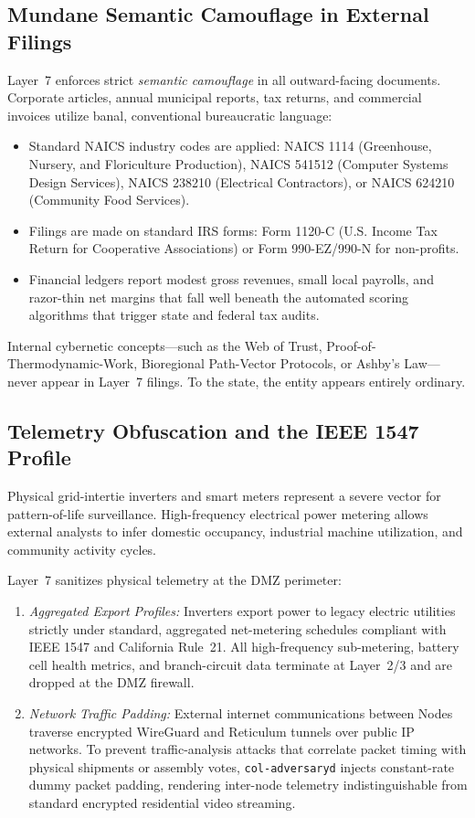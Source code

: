 \subsection{Mundane Semantic Camouflage in External Filings}

Layer~7 enforces strict \textit{semantic camouflage} in all outward-facing documents. Corporate articles, annual municipal reports, tax returns, and commercial invoices utilize banal, conventional bureaucratic language:
\begin{itemize}
  \item Standard NAICS industry codes are applied: NAICS 1114 (Greenhouse, Nursery, and Floriculture Production), NAICS 541512 (Computer Systems Design Services), NAICS 238210 (Electrical Contractors), or NAICS 624210 (Community Food Services).
  \item Filings are made on standard IRS forms: Form 1120-C (U.S. Income Tax Return for Cooperative Associations) or Form 990-EZ/990-N for non-profits.
  \item Financial ledgers report modest gross revenues, small local payrolls, and razor-thin net margins that fall well beneath the automated scoring algorithms that trigger state and federal tax audits.
\end{itemize}
Internal cybernetic concepts—such as the Web of Trust, Proof-of-Thermodynamic-Work, Bioregional Path-Vector Protocols, or Ashby's Law—never appear in Layer~7 filings. To the state, the entity appears entirely ordinary.

\subsection{Telemetry Obfuscation and the IEEE 1547 Profile}

Physical grid-intertie inverters and smart meters represent a severe vector for pattern-of-life surveillance. High-frequency electrical power metering allows external analysts to infer domestic occupancy, industrial machine utilization, and community activity cycles.

Layer~7 sanitizes physical telemetry at the DMZ perimeter:
\begin{enumerate}
  \item \textit{Aggregated Export Profiles:} Inverters export power to legacy electric utilities strictly under standard, aggregated net-metering schedules compliant with IEEE 1547 and California Rule~21. All high-frequency sub-metering, battery cell health metrics, and branch-circuit data terminate at Layer~2/3 and are dropped at the DMZ firewall.
  \item \textit{Network Traffic Padding:} External internet communications between Nodes traverse encrypted WireGuard and Reticulum tunnels over public IP networks. To prevent traffic-analysis attacks that correlate packet timing with physical shipments or assembly votes, \texttt{col-adversaryd} injects constant-rate dummy packet padding, rendering inter-node telemetry indistinguishable from standard encrypted residential video streaming.
\end{enumerate}

